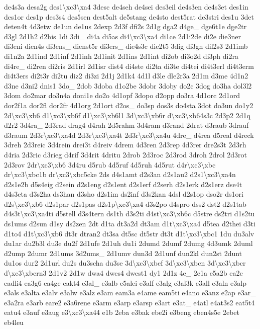 \begin{DoxyCompactItemize}
de4s3a desa2g des1\textbackslash{}xc3\textbackslash{}xa4 3desc de4seh de4sei des3eil de4s3en de4s3et des1in des1or des1p des3s4 des5sen dest5alt de5stang de4sto dest5rat de3stri des1u 3det deten4t 4d3etw de1un de1us 2dexp 2d3f dfi2s 2d1g dga2 d4ge\-\_\- dge6t1e dge2tr d3gl 2d1h2 d2his 1di 3di\-\_\- di4a di5as di4\textbackslash{}xc3\textbackslash{}xa4 di1ce 2d1i2de di2e die3ner di3eni dien4s di3ens\-\_\- dienst5r di3ers\-\_\- die4s3c die2t5 3dig di3gn dil2s3 2d1imb di1n2a 2d1ind 2d1inf 2d1inh 2d1init 2d1ins 2d1int di2ob di3o2d di3ph di2ra di4re\-\_\- di2ren di2ris 2d1irl 2d1isr dist4 di4ste di2ta di3te di4tei di4t3erl di4t3erm di4t3ers di2t3r di2tu diz2 di3zi 2d1j 2d1k4 4d1l d3le dle2r3a 2d1m d3me 4d1n2 d3ne d3ni2 dnis1 3do\-\_\- 2dob 3doba d1o2be 3dobr 3doby do2c 3dog do3ha dol3l2 3dom do2mar do3n4a doni1e do2o 4d1opf 3dopo d2opp do3ra 4d1orc 2d1ord dor2f1a dor2fl dor2fr 4d1org 2d1ort d2os\-\_\- do3sp dos3s do4sta 3dot do3un do1y2 2d\textbackslash{}xc3\textbackslash{}xb6 d1\textbackslash{}xc3\textbackslash{}xb6f d1\textbackslash{}xc3\textbackslash{}xb6l1 3d\textbackslash{}xc3\textbackslash{}xb6r d\textbackslash{}xc3\textbackslash{}xb64s3c 2d3p2 2d1q d2r2 3d4ra\-\_\- 2d3rad drag4 d4rah 2d5rahm 3d4ram d3rand 2drat d3raub 3drauf d3raum 2d3r\textbackslash{}xc3\textbackslash{}xa4d 2d3r\textbackslash{}xc3\textbackslash{}xa4t 2d3r\textbackslash{}xc3\textbackslash{}xa4u 4dre\-\_\- d4rea d5real d4reck 3dreh 2d3reic 3d4rein drei3t d4reiv 4drem 4d3ren 2d3rep 4d3rer dre2s3t 2d3rh d4ria 2d3ric d3rieg d4rif 3d4rit 4dritu 2drob 2d3roc 2d3rod 3droh 2drol 2d3rot 2d3rov 2dr\textbackslash{}xc3\textbackslash{}xb6 3d4ru d5rub 4d5ruf 4d5ruh 4d5rut d4r\textbackslash{}xc3\textbackslash{}xbc dr\textbackslash{}xc3\textbackslash{}xbc1b dr\textbackslash{}xc3\textbackslash{}xbc5cke 2ds d4s1amt d2s3an d2s1au2 d2s1\textbackslash{}xc3\textbackslash{}xa4n d2s1e2b d5s4eig d2sein d2s1eng d2s1ent d2s1erf d2serh d2s1erk d2s1erz dse4t d4s3eta d3s2ha ds3han d3sho d2s1im ds2inf d3s2kan 4dsl d2s1op dso2r ds1ori d2s\textbackslash{}xc3\textbackslash{}xb6 d2s1par d2s1pas d2s1p\textbackslash{}xc3\textbackslash{}xa4 d3s2po d4spro dss2 dst2 d2s1tab d4s3t\textbackslash{}xc3\textbackslash{}xa4ti d5stell d3s4tern ds1th d3s2ti d4st\textbackslash{}xc3\textbackslash{}xb6c d5stre ds2tri d1s2tu ds1ums d2sun d1sy ds2zen 2dt d1ta dt3a2d dt3am d1t\textbackslash{}xc3\textbackslash{}xa4 d5tea d2thei d3ti d1to4 d1t\textbackslash{}xc3\textbackslash{}xb6 dt3r dtran2 dt3sa dt5sc dt5str dt3t d1t\textbackslash{}xc3\textbackslash{}xbc1 1du du3alv du1ar du2b3l du3e du2f 2d1ufe 2d1uh du1i 2dumd 2dumf 2dumg 4d3umk 2duml d2ump 2dumr 2d1ums 3d2ums\-\_\- 2d1umv dun3d 2d1unf dun2kl dun2st 2dunt du1os dur2 2d1url du2s du3scha du3se 3d\textbackslash{}xc3\textbackslash{}xbcf 3d\textbackslash{}xc3\textbackslash{}xbcn 3d\textbackslash{}xc3\textbackslash{}xbcr d\textbackslash{}xc3\textbackslash{}xbcrn3 2d1v2 2d1w dwa4 dwes4 dwest1 dy1 2d1z 4e\-\_\- 2e1a e5a2b ea2c eadli4 ea3g6 ea4ge eakt4 e3al\-\_\- e3alb e5alei e3alf e3alg e3al3k e3all e3aln e3alp e3als e3alta e3alv e3alw e3alz e3am eam3a e4ame eam5ti e4ano e3anz e2ap e3ar\-\_\- e3a2ra e3arb eare2 e3a6rene e3arm e3arp e3arsp e3art e3at\-\_\- e4atl e4at3s2 eat5t4 eatu4 e3auf e3aug e3\textbackslash{}xc3\textbackslash{}xa44 e1b 2eba e3bak ebe2i e3beng eben4s5e 2ebet eb4leu 
\end{DoxyCompactItemize}
